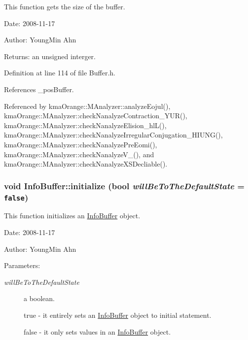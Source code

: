 This function gets the size of the buffer. 

\begin{Desc}
\item[Date:]2008-11-17 \end{Desc}
\begin{Desc}
\item[Author:]YoungMin Ahn \end{Desc}
\begin{Desc}
\item[Returns:]an unsigned interger. \end{Desc}


Definition at line 114 of file Buffer.h.

References \_\-posBuffer.

Referenced by kmaOrange::MAnalyzer::analyzeEojul(), kmaOrange::MAnalyzer::checkNanalyzeContraction\_\-YUR(), kmaOrange::MAnalyzer::checkNanalyzeElision\_\-hlL(), kmaOrange::MAnalyzer::checkNanalyzeIrregularConjugation\_\-HIUNG(), kmaOrange::MAnalyzer::checkNanalyzePreEomi(), kmaOrange::MAnalyzer::checkNanalyzeV\_\-(), and kmaOrange::MAnalyzer::checkNanalyzeXSDecliable().\hypertarget{classkmaOrange_1_1InfoBuffer_8f70fa82290a938617e23f0832daa02b}{
\subsubsection[{initialize}]{\setlength{\rightskip}{0pt plus 5cm}void InfoBuffer::initialize (bool {\em willBeToTheDefaultState} = {\tt false})}}
\label{classkmaOrange_1_1InfoBuffer_8f70fa82290a938617e23f0832daa02b}


This function initializes an \hyperlink{classkmaOrange_1_1InfoBuffer}{InfoBuffer} object. 

\begin{Desc}
\item[Date:]2008-11-17 \end{Desc}
\begin{Desc}
\item[Author:]YoungMin Ahn \end{Desc}
\begin{Desc}
\item[Parameters:]
\begin{description}
\item[{\em willBeToTheDefaultState}]a boolean.\par
 true - it entirely sets an \hyperlink{classkmaOrange_1_1InfoBuffer}{InfoBuffer} object to initial statement. \par
 false - it only sets values in an \hyperlink{classkmaOrange_1_1InfoBuffer}{InfoBuffer} object. \end{description}
\end{Desc}


